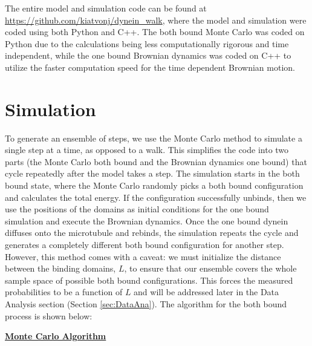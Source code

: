 
The entire model and simulation code can be found at \url{https://github.com/kiatvonj/dynein_walk}, where the model and simulation were coded using both Python and C++. The both bound Monte Carlo was coded on Python due to the calculations being less computationally rigorous and time independent, while the one bound Brownian dynamics was coded on C++ to utilize the faster computation speed for the time  dependent Brownian motion.

\section{Simulation}
To generate an ensemble of steps, we use the Monte Carlo method to simulate a single step at a time, as opposed to a walk. This simplifies the code into two parts (the Monte Carlo both bound and the Brownian dynamics one bound) that cycle repeatedly after the model takes a step. The simulation starts in the both bound state, where the Monte Carlo randomly picks a both bound configuration and calculates the total energy. If the configuration successfully unbinds, then we use the positions of the domains as initial conditions for the one bound simulation and execute the Brownian dynamics. Once the one bound dynein diffuses onto the microtubule and rebinds, the simulation repeats the cycle and generates a completely different both bound configuration for another step. However, this method comes with a caveat: we must initialize the distance between the binding domains, $L$, to ensure that our ensemble covers the whole sample space of possible both bound configurations. This forces the measured probabilities to be a function of $L$ and will be addressed later in the Data Analysis section (Section \ref{sec:DataAna}). The algorithm for the both bound process is shown below:

\newpage
\begin{center}\label{alg:MonteCarlo}
	\textbf{\underline{Monte Carlo Algorithm}}
\end{center}



